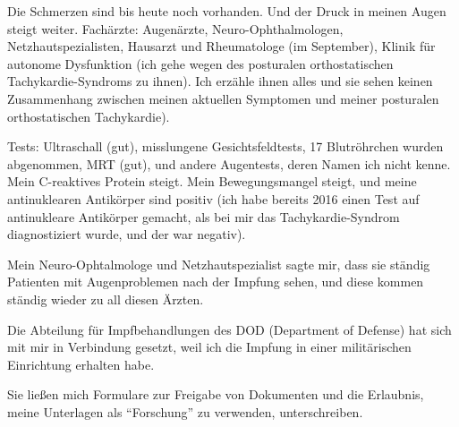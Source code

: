 {Die Schmerzen sind bis heute noch vorhanden. Und der Druck in meinen Augen
steigt weiter. Fachärzte: Augenärzte, Neuro-Ophthalmologen,
Netzhautspezialisten, Hausarzt und Rheumatologe (im September), Klinik für
autonome Dysfunktion (ich gehe wegen des posturalen orthostatischen
Tachykardie-Syndroms zu ihnen). Ich erzähle ihnen alles und sie sehen keinen
Zusammenhang zwischen meinen aktuellen Symptomen und meiner posturalen
orthostatischen Tachykardie).

Tests: Ultraschall (gut), misslungene Gesichtsfeldtests, 17 Blutröhrchen wurden
abgenommen, MRT (gut), und andere Augentests, deren Namen ich nicht kenne. Mein
C-reaktives Protein steigt. Mein Bewegungsmangel steigt, und meine antinuklearen
Antikörper sind positiv (ich habe bereits 2016 einen Test auf antinukleare
Antikörper gemacht, als bei mir das Tachykardie-Syndrom diagnostiziert wurde,
und der war negativ).

Mein Neuro-Ophtalmologe und Netzhautspezialist sagte mir, dass sie ständig
Patienten mit Augenproblemen nach der Impfung sehen, und diese kommen ständig
wieder zu all diesen Ärzten.

Die Abteilung für Impfbehandlungen des DOD (Department of Defense) hat sich mit
mir in Verbindung gesetzt, weil ich die Impfung in einer militärischen
Einrichtung erhalten habe.

Sie ließen mich Formulare zur Freigabe von Dokumenten und die Erlaubnis, meine
Unterlagen als “Forschung” zu verwenden, unterschreiben.

}
